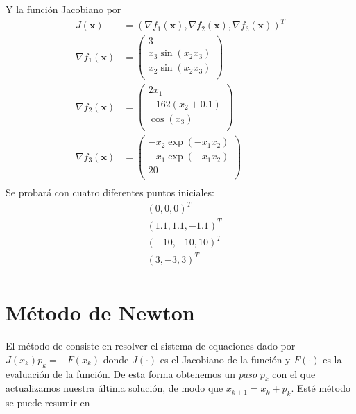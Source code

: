 \documentclass{article}
\begin{document}
\begin{multicols}{2}
Y la función Jacobiano por 
\begin{align*}
J(\boldsymbol{x}) &= (\nabla f_1(\boldsymbol{x}), \nabla f_2(\boldsymbol{x}), \nabla f_3(\boldsymbol{x}))^T\\
\nabla f_1(\boldsymbol{x}) &= \begin{pmatrix}
    3 \\
    x_3\sin(x_2x_3)\\
    x_2\sin(x_2x_3)\\
   \end{pmatrix}\\
\nabla f_2(\boldsymbol{x}) &= \begin{pmatrix}
    2x_1 \\
    -162(x_2 + 0.1)\\
    \cos(x_3)\\
   \end{pmatrix}\\
\nabla f_3(\boldsymbol{x}) &= \begin{pmatrix}
    -x_2\exp(-x_1x_2)\\
    -x_1\exp(-x_1x_2)\\
    20\\
   \end{pmatrix}\\
\end{align*}
Se probará con cuatro diferentes puntos iniciales:
\begin{align*}
&(0, 0 , 0)^T\\
&(1.1, 1.1 , -1.1)^T\\
&(-10, -10 , 10)^T\\
&(3, -3 , 3)^T\\
\end{align*}

\section{Método de Newton}

El método de consiste en resolver el sistema de equaciones dado por $J(x_k)p_k = -F(x_k)$ donde $J(\cdot)$ es el Jacobiano de la función y $F(\cdot)$ es la evaluación de la función. De esta forma obtenemos un \emph{paso} $p_k$ con el que actualizamos nuestra última solución, de modo que $x_{k+1} = x_k + p_k$. Esté método se puede resumir en


\end{multicols}
\end{document}
